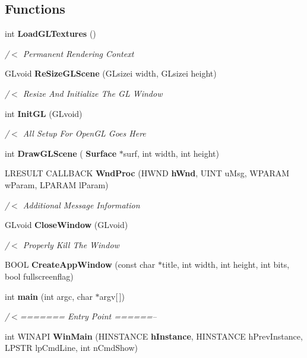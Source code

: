 \subsection*{Functions}
\begin{DoxyCompactItemize}
\item 
int \textbf{ Load\+G\+L\+Textures} ()
\begin{DoxyCompactList}\small\item\em /$<$ Permanent Rendering Context \end{DoxyCompactList}\item 
G\+Lvoid \textbf{ Re\+Size\+G\+L\+Scene} (G\+Lsizei width, G\+Lsizei height)
\begin{DoxyCompactList}\small\item\em /$<$ Resize And Initialize The GL Window \end{DoxyCompactList}\item 
int \textbf{ Init\+GL} (G\+Lvoid)
\begin{DoxyCompactList}\small\item\em /$<$ All Setup For Open\+GL Goes Here \end{DoxyCompactList}\item 
int \textbf{ Draw\+G\+L\+Scene} (\textbf{ Surface} $\ast$surf, int width, int height)
\item 
L\+R\+E\+S\+U\+LT C\+A\+L\+L\+B\+A\+CK \textbf{ Wnd\+Proc} (H\+W\+ND \textbf{ h\+Wnd}, U\+I\+NT u\+Msg, W\+P\+A\+R\+AM w\+Param, L\+P\+A\+R\+AM l\+Param)
\begin{DoxyCompactList}\small\item\em /$<$ Additional Message Information \end{DoxyCompactList}\item 
G\+Lvoid \textbf{ Close\+Window} (G\+Lvoid)
\begin{DoxyCompactList}\small\item\em /$<$ Properly Kill The Window \end{DoxyCompactList}\item 
B\+O\+OL \textbf{ Create\+App\+Window} (const char $\ast$title, int width, int height, int bits, bool fullscreenflag)
\item 
int \textbf{ main} (int argc, char $\ast$argv[$\,$])
\begin{DoxyCompactList}\small\item\em /$<$======= Entry Point ======-- \end{DoxyCompactList}\item 
int W\+I\+N\+A\+PI \textbf{ Win\+Main} (H\+I\+N\+S\+T\+A\+N\+CE \textbf{ h\+Instance}, H\+I\+N\+S\+T\+A\+N\+CE h\+Prev\+Instance, L\+P\+S\+TR lp\+Cmd\+Line, int n\+Cmd\+Show)

\end{DoxyCompactItemize}
